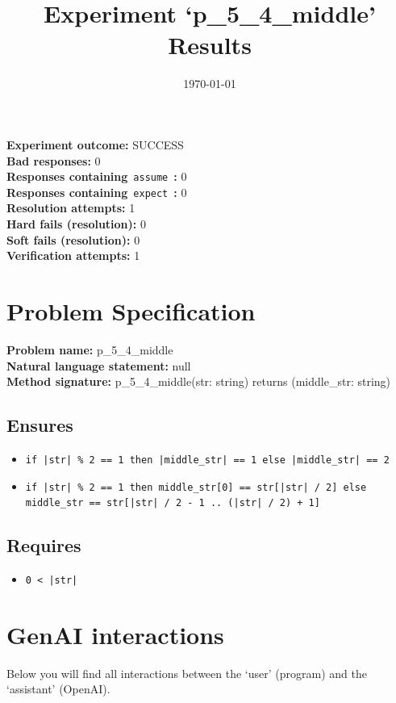 \documentclass{article}
\begin{document}
\title{Experiment `p\_5\_4\_middle' Results}
\author{\today}
\date{}
\maketitle
\textbf{Experiment outcome: }SUCCESS
\\\textbf{Bad responses: }0
\\\textbf{Responses containing}~\texttt{assume}~\textbf{: }0
\\\textbf{Responses containing}~\texttt{expect}~\textbf{: }0
\\\textbf{Resolution attempts: }1
\\\textbf{Hard fails (resolution): }0
\\\textbf{Soft fails (resolution): }0
\\\textbf{Verification attempts: }1
\section*{Problem Specification}
\textbf{Problem name: }p\_5\_4\_middle
\\\textbf{Natural language statement: }null
\\\textbf{Method signature: }p\_5\_4\_middle(str: string) returns (middle\_str: string)
\subsection*{Ensures}
\begin{itemize}
\item \texttt{if |str| \% 2 == 1 then |middle\_str| == 1 else |middle\_str| == 2}
\item \texttt{if |str| \% 2 == 1 then middle\_str[0] == str[|str| / 2] else middle\_str == str[|str| / 2 - 1 .. (|str| / 2) + 1]}
\end{itemize}
\subsection*{Requires}
\begin{itemize}
\item \texttt{0 < |str|}
\end{itemize}
\clearpage
\section*{GenAI interactions}
Below you will find all interactions between the `user' (program) and the `assistant' (OpenAI).
\end{document}
